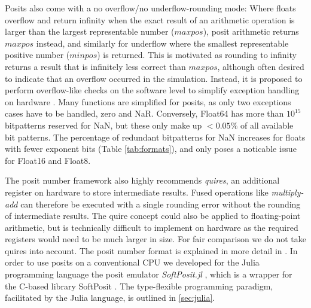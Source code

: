 \documentclass[draft]{agujournal2019}
\begin{document}
Posits also come with a no overflow/no underflow-rounding mode: Where floats overflow and return infinity when the exact result of an arithmetic operation is larger than the largest representable number ($maxpos$), posit arithmetic returns $maxpos$ instead, and similarly for underflow where the smallest representable positive number ($minpos$) is returned. This is motivated as rounding to infinity returns a result that is infinitely less correct than $maxpos$, although often desired to indicate that an overflow occurred in the simulation. Instead, it is proposed to perform overflow-like checks on the software level to simplify exception handling on hardware \cite{Gustafson2017a}. Many functions are simplified for posits, as only two exceptions cases have to be handled, zero and NaR. Conversely, Float64 has more than $10^{15}$ bitpatterns reserved for NaN, but these only make up $< 0.05\%$ of all available bit patterns. The percentage of redundant bitpatterns for NaN increases for floats with fewer exponent bits (Table \ref{tab:formats}), and only poses a noticable issue for Float16 and Float8.

The posit number framework also highly recommends \emph{quires}, an additional register on hardware to store intermediate results. Fused operations like \emph{multiply-add} can therefore be executed with a single rounding error without the rounding of intermediate results. The quire concept could also be applied to floating-point arithmetic, but is technically difficult to implement on hardware as the required registers would need to be much larger in size. For fair comparison we do not take quires into account. The posit number format is explained in more detail in . In order to use posits on a conventional CPU we developed for the Julia programming language \cite{Bezanson2017} the posit emulator \emph{SoftPosit.jl} \cite{Klower2019a}, which is a wrapper for the C-based library SoftPosit \cite{Leong2020}. The type-flexible programming paradigm,  facilitated by the Julia language, is outlined in \ref{sec:julia}.
\end{document}
